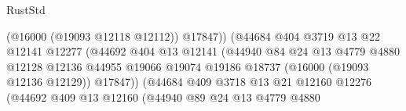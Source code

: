 \begin{lexlean}{RustStd}
\begin{coremodule}
                                                  (@16000 (@19093 @12118 @12112))
                                                  @17847))
                                              (@44684
                                                @404
                                                @3719
                                                @13
                                                @22
                                                @12141
                                                @12277
                                                (@44692
                                                  @404
                                                  @13
                                                  @12141
                                                  (@44940
                                                    @84
                                                    @24
                                                    @13
                                                    @4779
                                                    @4880
                                                    @12128
                                                    @12136
                                                    @44955
                                                    @19066
                                                    @19074
                                                    @19186
                                                    @18737
                                                    (@16000 (@19093 @12136 @12129))
                                                    @17847))
                                                (@44684
                                                  @409
                                                  @3718
                                                  @13
                                                  @21
                                                  @12160
                                                  @12276
                                                  (@44692
                                                    @409
                                                    @13
                                                    @12160
                                                    (@44940
                                                      @89
                                                      @24
                                                      @13
                                                      @4779
                                                      @4880

\end{coremodule}
\end{lexlean}
